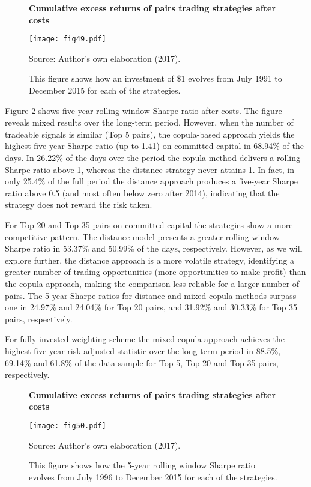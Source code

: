 \documentclass[a4paper,12pt]{report}
\begin{document}
	\begin{figure}[H]
		\centering
		\caption{\textbf{Cumulative excess returns of pairs trading strategies after costs}}
		\texttt{[image: fig49.pdf]}
		\captionsetup{justification=raggedright,
			singlelinecheck=false
		}
		\caption*{Source: Author's own elaboration (2017).}
		\caption*{\scriptsize This figure shows how an investment of \$1 evolves from July 1991 to December 2015 for each of the strategies.}
		\label{fig:fig49}
	\end{figure}
	
	Figure \ref{fig:fig50} shows five-year rolling window Sharpe ratio after costs. The figure reveals mixed results over the long-term period. However, when the number of tradeable signals is similar (Top 5 pairs), the copula-based approach yields the highest five-year Sharpe ratio (up to 1.41) on committed capital in 68.94\% of the days. In 26.22\% of the days over the period the copula method delivers a rolling Sharpe ratio above 1, whereas the distance strategy never attains 1. In fact, in only 25.4\% of the full period the distance approach produces a five-year Sharpe ratio above 0.5 (and most often below zero after 2014), indicating that the strategy does not reward the risk taken.
	
	For Top 20 and Top 35 pairs on committed capital the strategies show a more competitive pattern. The distance model presents a greater rolling window Sharpe ratio in 53.37\% and 50.99\% of the days, respectively. However, as we will explore further, the distance approach is a more volatile strategy, identifying a greater number of trading opportunities (more opportunities to make profit) than the copula approach, making the comparison less reliable for a larger number of pairs. The 5-year Sharpe ratios for distance and mixed copula methods surpass one in 24.97\% and 24.04\% for Top 20 pairs, and 31.92\% and 30.33\% for Top 35 pairs, respectively.
	
	For fully invested weighting scheme the mixed copula approach achieves the highest five-year risk-adjusted statistic over the long-term period in 88.5\%, 69.14\% and 61.8\% of the data sample for Top 5, Top 20 and Top 35 pairs, respectively.
	
	
	\begin{figure}[H]
		\centering
		\caption{\textbf{Cumulative excess returns of pairs trading strategies after costs}}
		\texttt{[image: fig50.pdf]}
		\captionsetup{justification=raggedright,
			singlelinecheck=false
		}
		\caption*{Source: Author's own elaboration (2017).}
		\caption*{\scriptsize This figure shows how the 5-year rolling window Sharpe ratio evolves from July 1996 to December 2015 for each of the strategies.}
		\label{fig:fig50}
	\end{figure}
	
\end{document}
